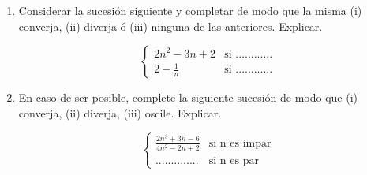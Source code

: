 \documentclass[12pt]{article}
\theoremstyle{definition}
\begin{document}
\begin{enumerate}
\item Considerar la sucesión siguiente y completar de modo que la misma (i) converja, (ii) diverja ó (iii) ninguna de las anteriores. Explicar.

\begin{equation*}
\begin{cases} 
 2n^2-3n+2  & \text{si  ............} \\
2-\frac{1}{n} & \text{si  ............} 
\end{cases}
\end{equation*}



\item En caso de ser posible, complete la siguiente sucesión de modo que (i) converja, (ii) diverja, (iii) oscile. Explicar.

\begin{equation*}
\begin{cases} 
 \frac{2n^3+3n-6}{4n^2-2n+2}  & \text{si  n es impar} \\
..............& \text{si  n es par}
\end{cases}
\end{equation*}

\end{enumerate}
\end{document}
